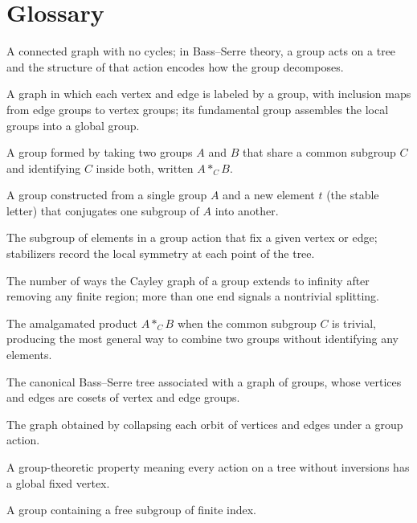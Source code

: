 \section*{Glossary}
\begin{description}[leftmargin=*,style=nextline,itemsep=0.3em]

\item[\textbf{Tree.}] A connected graph with no cycles; in Bass--Serre theory, a group acts on a tree and the structure of that action encodes how the group decomposes.

\item[\textbf{Graph of groups.}] A graph in which each vertex and edge is labeled by a group, with inclusion maps from edge groups to vertex groups; its fundamental group assembles the local groups into a global group.

\item[\textbf{Amalgamated product.}] A group formed by taking two groups $A$ and $B$ that share a common subgroup $C$ and identifying $C$ inside both, written $A*_C B$.

\item[\textbf{HNN extension.}] A group constructed from a single group $A$ and a new element $t$ (the stable letter) that conjugates one subgroup of $A$ into another.

\item[\textbf{Stabilizer.}] The subgroup of elements in a group action that fix a given vertex or edge; stabilizers record the local symmetry at each point of the tree.

\item[\textbf{Ends of a group.}] The number of ways the Cayley graph of a group extends to infinity after removing any finite region; more than one end signals a nontrivial splitting.

\item[\textbf{Free product.}] The amalgamated product $A*_C B$ when the common subgroup $C$ is trivial, producing the most general way to combine two groups without identifying any elements.

\item[\textbf{Covering tree.}] The canonical Bass--Serre tree associated with a graph of groups, whose vertices and edges are cosets of vertex and edge groups.

\item[\textbf{Quotient graph.}] The graph obtained by collapsing each orbit of vertices and edges under a group action.

\item[\textbf{Kazhdan's property (T).}] A group-theoretic property meaning every action on a tree without inversions has a global fixed vertex.

\item[\textbf{Virtually free.}] A group containing a free subgroup of finite index.

\end{description}


